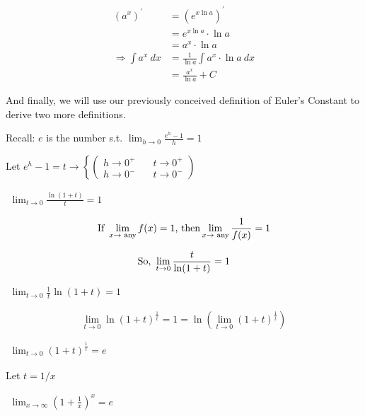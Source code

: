 \documentclass{article}
\begin{document}
\begin{align*}
(a^x)^\prime&=(e^{x\ln a})^\prime\\
&=e^{x\ln a}\cdot\ln a\\
&=a^x\cdot\ln a\\
\Rightarrow\int a^x\ dx&=\frac{1}{\ln a}\int a^x\cdot\ln a\ dx\\
&=\frac{a^x}{\ln a}+C
\end{align*}

And finally, we will use our previously conceived definition of Euler's Constant to derive two more definitions.

\vspace{10pt}

Recall: $e$ is the number s.t. $\displaystyle\lim_{h\to0}\frac{e^h-1}{h}=1$

\begin{center}
Let $e^h-1=t\rightarrow
\left\{\begin{pmatrix}
h\to0^+&\quad t\to0^+\\
h\to0^-&\quad t\to0^-
\end{pmatrix}\right.$
\end{center}

\begin{center}
$\boxed{\begin{gathered}
\lim_{t\to0}\frac{\ln(1+t)}{t}=1
\end{gathered}}$
\end{center}

\[\textnormal{If }\lim_{x\to\textnormal{ any}}f(x)=1\textnormal{, then}\lim_{x\to\textnormal{ any}}\frac{1}{f(x)}=1\]

\[\textnormal{So, }\lim_{t\to0}\frac{t}{\ln(1+t)}=1\]

\begin{center}
$\boxed{\begin{gathered}
\lim_{t\to0}\frac{1}{t}\ln(1+t)=1
\end{gathered}}$
\end{center}

\[\lim_{t\to0}\ln(1+t)^\frac{1}{t}=1=\ln(\lim_{t\to0}(1+t)^\frac{1}{t})\]

\begin{center}
$\boxed{\begin{gathered}
\lim_{t\to0}(1+t)^\frac{1}{t}=e
\end{gathered}}$
\end{center}

Let $t=1/x$

\begin{center}
$\boxed{\begin{gathered}
\lim_{x\to\infty}\left(1+\frac{1}{x}\right)^x=e
\end{gathered}}$
\end{center}
\end{document}
